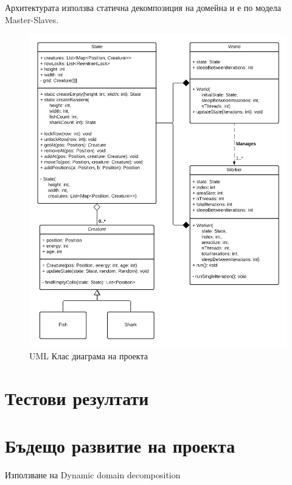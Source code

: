 \documentclass{article}
\begin{document}
Архитектурата използва статична декомпозиция на домейна и е по модела Master-Slaves.

\begin{figure}[H]
	\centering
	\includegraphics[width=1.1\textwidth]{classes-uml.png}
	\caption{UML Клас диаграма на проекта}
	\label{fig:figure1}
\end{figure}

\section{Тестови резултати}

\section{Бъдещо развитие на проекта}
Използване на Dynamic domain decomposition
\end{document}
